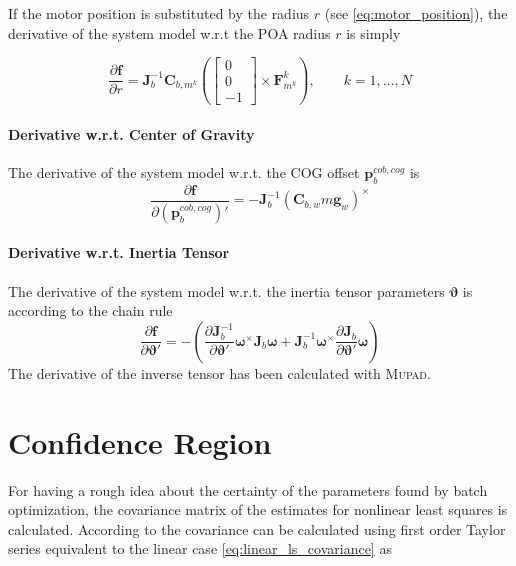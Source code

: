 If the motor position is substituted by the radius $r$ (see \cref{eq:motor_position}), the derivative of the system model w.r.t the POA radius $r$ is simply

\begin{equation}
\frac{\partial \mathbf{f}}{\partial r} =
\mathbf{J}_b^{-1} 
\mathbf{C}_{b,m^k}
\left(
\left[ \begin{array}{c}
0 \\
0 \\
-1
\end{array} \right]
\times
\mathbf{F}^k_{m^k} \right)
, \qquad k = 1,...,N
\end{equation}

\paragraph{Derivative w.r.t. Center of Gravity\\}
The derivative of the system model w.r.t. the COG offset $\mathbf{p}^{cob,cog}_{b}$ is
\begin{equation}
\frac{\partial \mathbf{f}}{\partial (\mathbf{p}^{cob,cog}_{b})'} =
-
\mathbf{J}_b^{-1} 
\left( \mathbf{C}_{b,w} m \mathbf{g}_w \right) ^\times
\end{equation}

\paragraph{Derivative w.r.t. Inertia Tensor\\}
The derivative of the system model w.r.t. the inertia tensor parameters $\boldsymbol{\vartheta}$ is
according to the chain rule
\begin{equation}
\frac{\partial \mathbf{f}}{\partial \boldsymbol{\vartheta}'} =
-
\left(
\frac{\partial \mathbf{J}_b^{-1}}{\partial \boldsymbol{\vartheta}'}
\boldsymbol{\omega} ^\times \mathbf{J}_b \boldsymbol{\omega}
+
\mathbf{J}_b^{-1}
\boldsymbol{\omega} ^\times \frac{\partial \mathbf{J}_b}{\partial \boldsymbol{\vartheta}'} \boldsymbol{\omega}
\right)
\end{equation}
The derivative of the inverse tensor has been calculated with \textsc{Mupad}.
\\

\section{Confidence Region}
\label{sec:confidence_region}
For having a rough idea about the certainty of the parameters found by batch optimization, the covariance matrix of the estimates for nonlinear least squares is calculated.
According to \citet[chap. 2]{Seber} the covariance can be calculated using first order Taylor series equivalent to the linear case \cref{eq:linear_ls_covariance} as

